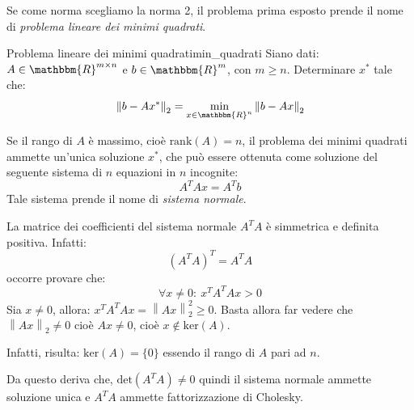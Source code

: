 \documentclass[12pt]{report}
\newcounter{theorem}
\newcommand{\nmu}{}
\begin{document}
Se come norma scegliamo la norma 2, il problema prima esposto prende il nome di \textit{problema lineare dei minimi quadrati}.
\begin{assignment}{\nmu Problema lineare dei minimi quadrati}{min_quadrati}
Siano dati: $A \in \mathbbm{R}^{m\times n}$ e $b \in \mathbbm{R}^m$, con $m \geq n$. Determinare $x^*$ tale che:
\[
\left\|b - Ax^*\right\|_2 = \min_{x \in \mathbbm{R}^n}\left\|b-Ax\right\|_2
\]
\end{assignment}
\begin{theorem}{}{}
	Se il rango di $A$ è massimo, cioè $\text{rank}(A) = n$, il problema dei minimi quadrati ammette un'unica soluzione $x^*$, che può essere ottenuta come soluzione del seguente sistema di  $n$ equazioni in $n$ incognite:
	\[
	A^TAx = A^Tb
	\]
	Tale sistema prende il nome di \textit{sistema normale}.
\end{theorem}
\begin{note}{}{}
La matrice dei coefficienti del sistema normale $A^TA$ è simmetrica e definita positiva. Infatti:
\[
(A^TA)^T = A^TA
\]
occorre provare che:
\[
\forall x \neq 0:\ x^TA^TAx > 0
\]
Sia $x \neq 0$, allora: $x^TA^TAx = \left\|Ax\right\|_2^2 \geq 0$. Basta allora far vedere che $\left\|Ax\right\|_2 \neq 0$ cioè $Ax \neq 0$, cioè $x \notin \text{ker}(A)$.

Infatti, risulta: $\text{ker}(A) = \{0\}$ essendo il rango di $A$ pari ad $n$.

Da questo deriva che, $\text{det}\left(A^TA\right) \neq 0$ quindi il sistema normale ammette soluzione unica e $A^TA$ ammette fattorizzazione di Cholesky.
\end{note}
\end{document}
